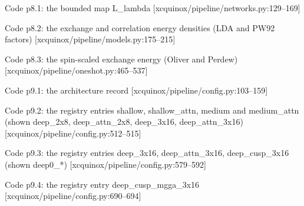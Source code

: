 \begin{frame}[allowframebreaks]{Code p8.1: the bounded map L\_lambda [xcquinox/pipeline/networks.py:129--169]}
\label{code:p8_1_the_bounded_map_l_lambda}
\end{frame}
\begin{frame}[allowframebreaks]{Code p8.2: the exchange and correlation energy densities (LDA and PW92 factors) [xcquinox/pipeline/models.py:175--215]}
\label{code:p8_2_the_exchange_and_correlation_energy_dens}
\end{frame}
\begin{frame}[allowframebreaks]{Code p8.3: the spin-scaled exchange energy (Oliver and Perdew) [xcquinox/pipeline/oneshot.py:465--537]}
\label{code:p8_3_the_spin_scaled_exchange_energy_oliver_a}
\end{frame}
\begin{frame}[allowframebreaks]{Code p9.1: the architecture record [xcquinox/pipeline/config.py:103--159]}
\label{code:p9_1_the_architecture_record}
\end{frame}
\begin{frame}[allowframebreaks]{Code p9.2: the registry entries shallow, shallow\_attn, medium and medium\_attn (shown deep\_2x8, deep\_attn\_2x8, deep\_3x16, deep\_attn\_3x16) [xcquinox/pipeline/config.py:512--515]}
\label{code:p9_2_the_registry_entries_shallow_shallow_att}
\end{frame}
\begin{frame}[allowframebreaks]{Code p9.3: the registry entries deep\_3x16, deep\_attn\_3x16, deep\_cusp\_3x16 (shown deep0\_*) [xcquinox/pipeline/config.py:579--592]}
\label{code:p9_3_the_registry_entries_deep_3x16_deep_attn}
\end{frame}
\begin{frame}[allowframebreaks]{Code p9.4: the registry entry deep\_cusp\_mgga\_3x16 [xcquinox/pipeline/config.py:690--694]}
\label{code:p9_4_the_registry_entry_deep_cusp_mgga_3x16}
\end{frame}
